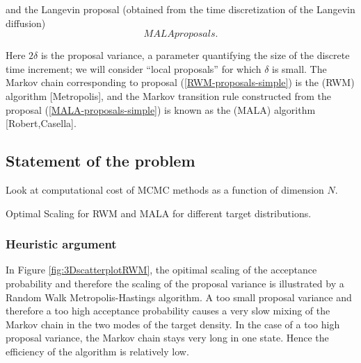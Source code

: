 and the Langevin proposal (obtained from the time discretization of the
Langevin diffusion)
\begin{equation}
\label{MALA-proposals-simple}
 MALA proposals.
\end{equation}

Here $ 2 \delta $ is the proposal variance, a parameter quantifying the size of the
discrete time increment; we will consider “local proposals” for which $ \delta $ is
small. The Markov chain corresponding to proposal (\ref{RWM-proposals-simple}) is the (RWM) algorithm [Metropolis], and the Markov transition rule constructed from the proposal (\ref{MALA-proposals-simple}) is known as the (MALA) algorithm [Robert,Casella].


\subsection*{Statement of the problem}

Look at computational cost of MCMC methods as a function of dimension $ N $.

Optimal Scaling for RWM and MALA for different target distributions.

\subsubsection*{Heuristic argument}

In Figure \ref{fig:3DscatterplotRWM}, the opitimal scaling of the acceptance probability and therefore the scaling of the proposal variance is illustrated by a Random Walk Metropolis-Hastings algorithm. A too small proposal variance and therefore a too high acceptance probability causes a very slow mixing of the Markov chain in the two modes of the target density. In the case of a too high proposal variance, the Markov chain stays very long in one state. Hence the efficiency of the algorithm is relatively low.


